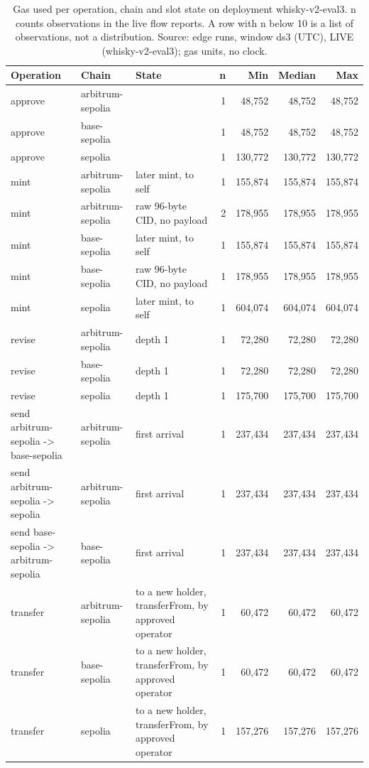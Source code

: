 \begin{table}[htbp]
    \centering
    \small
    \begin{tabular}{lllrrrr}
    \toprule
    Operation & Chain & State & n & Min & Median & Max \\
    \midrule
    approve & arbitrum-sepolia &  & 1 & 48,752 & 48,752 & 48,752 \\
    approve & base-sepolia &  & 1 & 48,752 & 48,752 & 48,752 \\
    approve & sepolia &  & 1 & 130,772 & 130,772 & 130,772 \\
    mint & arbitrum-sepolia & later mint, to self & 1 & 155,874 & 155,874 & 155,874 \\
    mint & arbitrum-sepolia & raw 96-byte CID, no payload & 2 & 178,955 & 178,955 & 178,955 \\
    mint & base-sepolia & later mint, to self & 1 & 155,874 & 155,874 & 155,874 \\
    mint & base-sepolia & raw 96-byte CID, no payload & 1 & 178,955 & 178,955 & 178,955 \\
    mint & sepolia & later mint, to self & 1 & 604,074 & 604,074 & 604,074 \\
    revise & arbitrum-sepolia & depth 1 & 1 & 72,280 & 72,280 & 72,280 \\
    revise & base-sepolia & depth 1 & 1 & 72,280 & 72,280 & 72,280 \\
    revise & sepolia & depth 1 & 1 & 175,700 & 175,700 & 175,700 \\
    send arbitrum-sepolia -> base-sepolia & arbitrum-sepolia & first arrival & 1 & 237,434 & 237,434 & 237,434 \\
    send arbitrum-sepolia -> sepolia & arbitrum-sepolia & first arrival & 1 & 237,434 & 237,434 & 237,434 \\
    send base-sepolia -> arbitrum-sepolia & base-sepolia & first arrival & 1 & 237,434 & 237,434 & 237,434 \\
    transfer & arbitrum-sepolia & to a new holder, transferFrom, by approved operator & 1 & 60,472 & 60,472 & 60,472 \\
    transfer & base-sepolia & to a new holder, transferFrom, by approved operator & 1 & 60,472 & 60,472 & 60,472 \\
    transfer & sepolia & to a new holder, transferFrom, by approved operator & 1 & 157,276 & 157,276 & 157,276 \\
    \bottomrule
    \end{tabular}
    \caption{Gas used per operation, chain and slot state on deployment whisky-v2-eval3. n counts observations in the live flow reports. A row with n below 10 is a list of observations, not a distribution. Source: edge runs, window ds3 (UTC), LIVE (whisky-v2-eval3); gas units, no clock.}
    \label{tab:gas-per-operation-edge}
\end{table}
